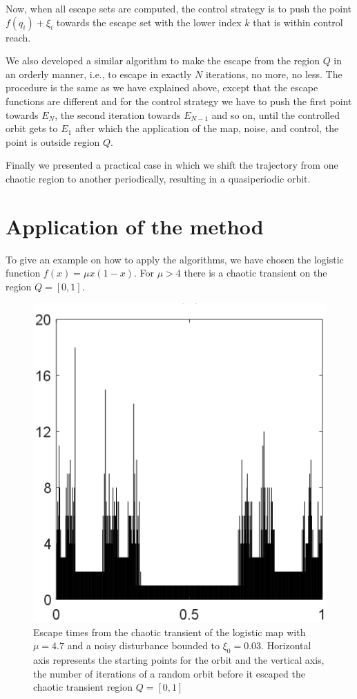 Now, when all escape sets are computed, the control strategy is to push the point $f(q_i) + \xi_i$ towards the escape set with the lower index $k$ that is within control reach.

We also developed a similar algorithm to make the escape from the region $Q$ in an orderly manner, i.e., to escape in exactly $N$ iterations, no more, no less. The procedure is the same as we have explained above, except that the escape functions are different and for the control strategy we have to push the first point towards $E_N$, the second iteration towards $E_{N-1}$ and so on, until the controlled orbit gets to $E_1$ after which the application of the map, noise, and control, the point is outside region $Q$.

Finally we presented a practical case in which we shift the trajectory from one chaotic region to another periodically, resulting in a quasiperiodic orbit.

\section{Application of the method}


To give an example on how to apply the algorithms, we have chosen the logistic function $f(x) = \mu x(1-x)$. For $\mu > 4$ there is a chaotic transient on the region $Q=[0,1]$. 

\begin{figure}
    \centering
    \includegraphics[width=0.5\linewidth]{Images/P1/EscapeTimes.eps}
    \caption{Escape times from the chaotic transient of the logistic map with $\mu=4.7$ and a noisy disturbance bounded to $\xi_0 = 0.03$. Horizontal axis represents the starting points for the orbit and the vertical axis, the number of iterations of a random orbit before it escaped the chaotic transient region $Q = [0,1]$}
    \label{fig:EscapeTimes}
\end{figure}

